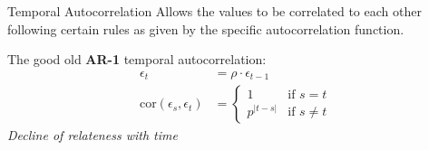 \documentclass{beamer}
\begin{document}
\begin{frame}{Temporal Autocorrelation}
Allows the values to be correlated to each other following certain rules as given by the specific autocorrelation function.
\vspace{0.3cm}

The good old \textbf{AR-1} temporal autocorrelation:
\begin{align*}
\epsilon_t &= \rho \cdot \epsilon_{t-1} \\
\text{cor}(\epsilon_s, \epsilon_t) &= 
\begin{cases} 
1 & \text{if } s = t \\
p^{\vert t-s \vert} & \text{if } s \neq t
\end{cases}
\end{align*}
\textit{Decline of relateness with time}
\end{frame}
\end{document}
